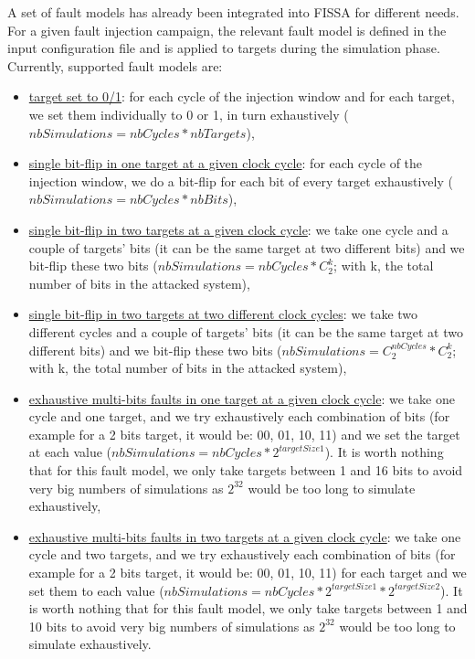 A set of fault models has already been integrated into FISSA for different needs. For a given fault injection campaign, the relevant fault model is defined in the input configuration file and is applied to targets during the simulation phase.
Currently, supported fault models are:
\begin{itemize}
    \justifying
    \item \underline{target set to 0/1}: for each cycle of the injection window and for each target, we set them individually to 0 or 1, in turn exhaustively ($nbSimulations = nbCycles * nbTargets$),
    \item \underline{single bit-flip in one target at a given clock cycle}: for each cycle of the injection window, we do a bit-flip for each bit of every target exhaustively ($nbSimulations = nbCycles * nbBits$),
    \item \underline{single bit-flip in two targets at a given clock cycle}: we take one cycle and a couple of targets' bits (it can be the same target at two different bits) and we bit-flip these two bits ($nbSimulations = nbCycles * C_{2}^k$; with k, the total number of bits in the attacked system),
    \item \underline{single bit-flip in two targets at two different clock cycles}:  we take two different cycles and a couple of targets' bits (it can be the same target at two different bits) and we bit-flip these two bits ($nbSimulations = C_{2}^{nbCycles} * C_{2}^k$; with k, the total number of bits in the attacked system),
    \item \underline{exhaustive multi-bits faults in one target at a given clock cycle}: we take one cycle and one target, and we try exhaustively each combination of bits (for example for a 2 bits target, it would be: 00, 01, 10, 11) and we set the target at each value ($nbSimulations = nbCycles * 2^{targetSize1}$). It is worth nothing that for this fault model, we only take targets between 1 and 16 bits to avoid very big numbers of simulations as $2^{32}$ would be too long to simulate exhaustively,
    \item \underline{exhaustive multi-bits faults in two targets at a given clock cycle}: we take one cycle and two targets, and we try exhaustively each combination of bits (for example for a 2 bits target, it would be: 00, 01, 10, 11) for each target and we set them to each value ($nbSimulations = nbCycles * 2^{targetSize1}* 2^{targetSize2}$). It is worth nothing that for this fault model, we only take targets between 1 and 10 bits to avoid very big numbers of simulations as $2^{32}$ would be too long to simulate exhaustively.
\end{itemize}

